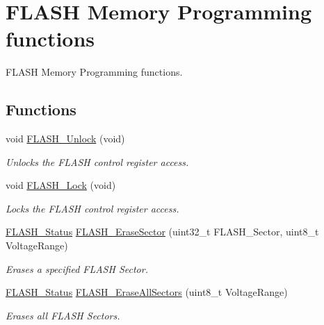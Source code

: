 \hypertarget{group___f_l_a_s_h___group2}{\section{F\-L\-A\-S\-H Memory Programming functions}
\label{group___f_l_a_s_h___group2}
}


F\-L\-A\-S\-H Memory Programming functions.  


\subsection*{Functions}
\begin{DoxyCompactItemize}
\item 
void \hyperlink{group___f_l_a_s_h___group2_ga4084d0184bab463a1579271bf474aaef}{F\-L\-A\-S\-H\-\_\-\-Unlock} (void)
\begin{DoxyCompactList}\small\item\em Unlocks the F\-L\-A\-S\-H control register access. \end{DoxyCompactList}\item 
void \hyperlink{group___f_l_a_s_h___group2_ga46899557353c4312ddbe3f25e65df1d8}{F\-L\-A\-S\-H\-\_\-\-Lock} (void)
\begin{DoxyCompactList}\small\item\em Locks the F\-L\-A\-S\-H control register access. \end{DoxyCompactList}\item 
\hyperlink{group___f_l_a_s_h_gadc63a6f3404ff1f71229a66915e9cdc0}{F\-L\-A\-S\-H\-\_\-\-Status} \hyperlink{group___f_l_a_s_h___group2_ga48f408290b32a3aebbcad83a00fc447c}{F\-L\-A\-S\-H\-\_\-\-Erase\-Sector} (uint32\-\_\-t F\-L\-A\-S\-H\-\_\-\-Sector, uint8\-\_\-t Voltage\-Range)
\begin{DoxyCompactList}\small\item\em Erases a specified F\-L\-A\-S\-H Sector. \end{DoxyCompactList}\item 
\hyperlink{group___f_l_a_s_h_gadc63a6f3404ff1f71229a66915e9cdc0}{F\-L\-A\-S\-H\-\_\-\-Status} \hyperlink{group___f_l_a_s_h___group2_ga2aee006e5f4db4280bdedd401dfa50f9}{F\-L\-A\-S\-H\-\_\-\-Erase\-All\-Sectors} (uint8\-\_\-t Voltage\-Range)
\begin{DoxyCompactList}\small\item\em Erases all F\-L\-A\-S\-H Sectors. \end{DoxyCompactList}\item 

\end{DoxyCompactItemize}
